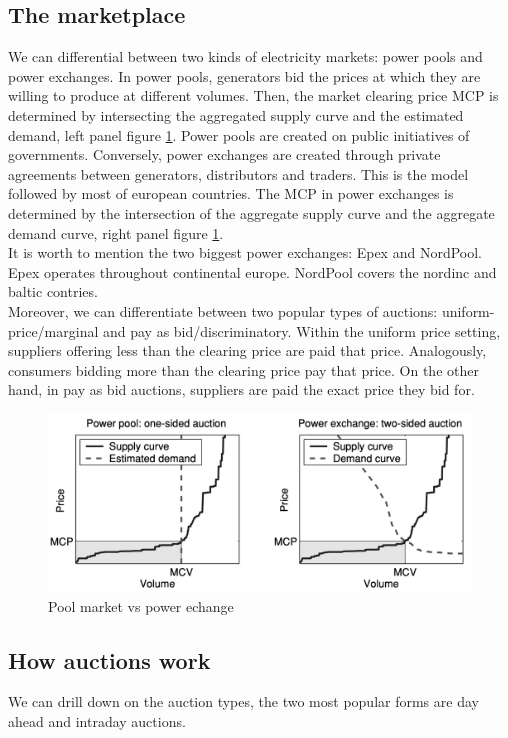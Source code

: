 \subsection{The marketplace}
We can differential between two kinds of electricity markets: power pools and power exchanges. In power pools, generators bid the prices at which they are willing to produce at different volumes. Then, the market clearing price MCP is determined by intersecting the aggregated supply curve and the estimated demand, left panel figure \ref{fig:pool_vs_echange}. Power pools are created on public initiatives of governments. Conversely, power exchanges are created through private agreements between generators, distributors and traders. This is the model followed by most of european countries.
The MCP in power exchanges is determined by the intersection of the aggregate supply curve and the aggregate demand curve, right panel figure \ref{fig:pool_vs_echange}.
\\
It is worth to mention the two biggest power exchanges: Epex and NordPool. Epex operates throughout continental europe. NordPool covers the nordinc and baltic contries.
\\
Moreover, we can differentiate between two popular types of auctions: uniform-price/marginal and pay as bid/discriminatory. Within the uniform price setting, suppliers offering less than the clearing price are paid that price. Analogously, consumers bidding more than the clearing price pay that price. On the other hand, in pay as bid auctions, suppliers are paid the exact price they bid for.


\begin{figure}[!h]
    \includegraphics[width=\textwidth]{images/pool_vs_echange.png}
    \caption{Pool market vs power echange \cite{weron2006modeling}}
    \label{fig:pool_vs_echange}
\end{figure}

\subsection{How auctions work}
We can drill down on the auction types, the two most popular forms are day ahead and intraday auctions.
